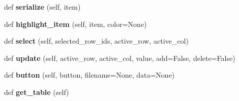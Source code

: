 \begin{DoxyCompactItemize}
def {\bfseries serialize} (self, item)
\item 
\mbox{\label{classrnb-planning_1_1src_1_1pkg_1_1ui_1_1table_1_1table__interface_1_1_table_interface_a59015ad619ae2f484145bee57a121d4c}} 
def {\bfseries highlight\+\_\+item} (self, item, color=None)
\item 
\mbox{\label{classrnb-planning_1_1src_1_1pkg_1_1ui_1_1table_1_1table__interface_1_1_table_interface_a0a10a32fde7d498d54fce7030f519ff1}} 
def {\bfseries select} (self, selected\+\_\+row\+\_\+ids, active\+\_\+row, active\+\_\+col)
\item 
\mbox{\label{classrnb-planning_1_1src_1_1pkg_1_1ui_1_1table_1_1table__interface_1_1_table_interface_aa8074f4f84b3fc131483af2bc73dfaf6}} 
def {\bfseries update} (self, active\+\_\+row, active\+\_\+col, value, add=False, delete=False)
\item 
\mbox{\label{classrnb-planning_1_1src_1_1pkg_1_1ui_1_1table_1_1table__interface_1_1_table_interface_afc49905efe872c9e0eb2a06e25d2e5b1}} 
def {\bfseries button} (self, button, filename=None, data=None)
\item 
\mbox{\label{classrnb-planning_1_1src_1_1pkg_1_1ui_1_1table_1_1table__interface_1_1_table_interface_a52575e920cb5479e5be820dd8cf7d26b}} 
def {\bfseries get\+\_\+table} (self)
\end{DoxyCompactItemize}
